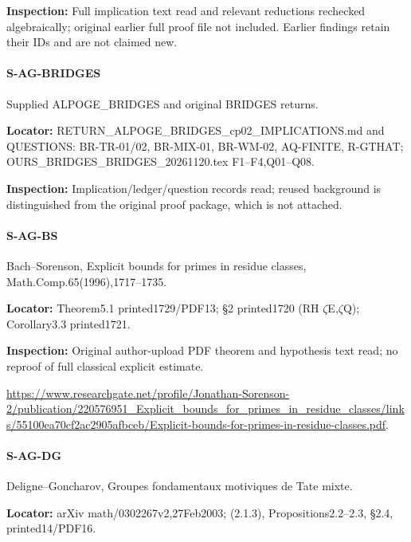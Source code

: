 \documentclass[11pt,a4paper]{article}
\begin{document}
\textbf{Inspection:} Full implication text read and relevant reductions rechecked algebraically; original earlier full proof file not included.\allowbreak{} Earlier findings retain their IDs and are not claimed new.\allowbreak{}


\paragraph{S-AG-BRIDGES} Supplied ALPOGE\_\allowbreak{}BRIDGES and original BRIDGES returns.

\textbf{Locator:} RETURN\_\allowbreak{}ALPOGE\_\allowbreak{}BRIDGES\_\allowbreak{}cp02\_\allowbreak{}IMPLICATIONS.\allowbreak{}md and QUESTIONS:\allowbreak{} BR-TR-01/\allowbreak{}02, BR-MIX-01, BR-WM-02, AQ-FINITE, R-GTHAT; OURS\_\allowbreak{}BRIDGES\_\allowbreak{}BRIDGES\_\allowbreak{}20261120.\allowbreak{}tex F1–\allowbreak{}F4,Q01–\allowbreak{}Q08.

\textbf{Inspection:} Implication/\allowbreak{}ledger/\allowbreak{}question records read; reused background is distinguished from the original proof package, which is not attached.\allowbreak{}


\paragraph{S-AG-BS} Bach–\allowbreak{}Sorenson, Explicit bounds for primes in residue classes, Math.\allowbreak{}Comp.\allowbreak{}65(1996),1717–\allowbreak{}1735.

\textbf{Locator:} Theorem5.\allowbreak{}1 printed1729/\allowbreak{}PDF13; §2 printed1720 (RH \ensuremath{\zeta}E,\ensuremath{\zeta}Q); Corollary3.\allowbreak{}3 printed1721.

\textbf{Inspection:} Original author-upload PDF theorem and hypothesis text read; no reproof of full classical explicit estimate.\allowbreak{}

\url{https://www.researchgate.net/profile/Jonathan-Sorenson-2/publication/220576951_Explicit_bounds_for_primes_in_residue_classes/links/55100ea70cf2ac2905afbceb/Explicit-bounds-for-primes-in-residue-classes.pdf}.

\paragraph{S-AG-DG} Deligne–\allowbreak{}Goncharov, Groupes fondamentaux motiviques de Tate mixte.

\textbf{Locator:} arXiv math/\allowbreak{}0302267v2,27Feb2003; (2.\allowbreak{}1.\allowbreak{}3), Propositions2.\allowbreak{}2–\allowbreak{}2.\allowbreak{}3, §2.\allowbreak{}4, printed14/\allowbreak{}PDF16.
\end{document}

